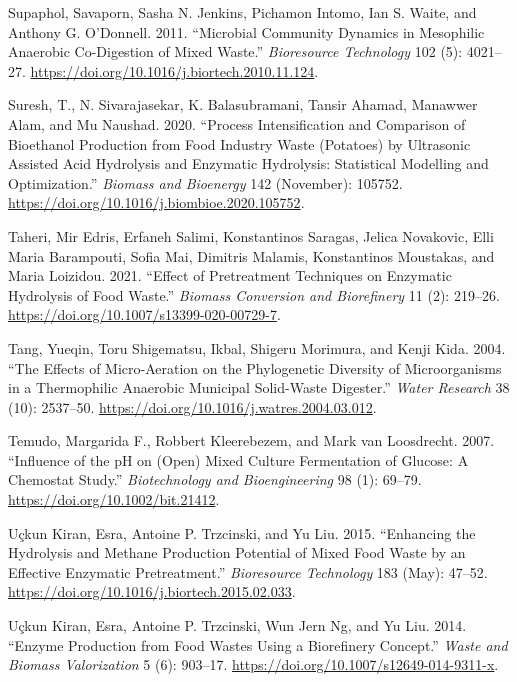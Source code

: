 \documentclass[11pt]{report}
\begin{document}
\begin{hangparas}{1.5em}{1}
\hypertarget{citeproc_bib_item_71}{Supaphol, Savaporn, Sasha N. Jenkins, Pichamon Intomo, Ian S. Waite, and Anthony G. O’Donnell. 2011. “Microbial Community Dynamics in Mesophilic Anaerobic Co-Digestion of Mixed Waste.” \textit{Bioresource Technology} 102 (5): 4021–27. \url{https://doi.org/10.1016/j.biortech.2010.11.124}.}

\hypertarget{citeproc_bib_item_72}{Suresh, T., N. Sivarajasekar, K. Balasubramani, Tansir Ahamad, Manawwer Alam, and Mu Naushad. 2020. “Process Intensification and Comparison of Bioethanol Production from Food Industry Waste (Potatoes) by Ultrasonic Assisted Acid Hydrolysis and Enzymatic Hydrolysis: Statistical Modelling and Optimization.” \textit{Biomass and Bioenergy} 142 (November): 105752. \url{https://doi.org/10.1016/j.biombioe.2020.105752}.}

\hypertarget{citeproc_bib_item_73}{Taheri, Mir Edris, Erfaneh Salimi, Konstantinos Saragas, Jelica Novakovic, Elli Maria Barampouti, Sofia Mai, Dimitris Malamis, Konstantinos Moustakas, and Maria Loizidou. 2021. “Effect of Pretreatment Techniques on Enzymatic Hydrolysis of Food Waste.” \textit{Biomass Conversion and Biorefinery} 11 (2): 219–26. \url{https://doi.org/10.1007/s13399-020-00729-7}.}

\hypertarget{citeproc_bib_item_74}{Tang, Yueqin, Toru Shigematsu, Ikbal, Shigeru Morimura, and Kenji Kida. 2004. “The Effects of Micro-Aeration on the Phylogenetic Diversity of Microorganisms in a Thermophilic Anaerobic Municipal Solid-Waste Digester.” \textit{Water Research} 38 (10): 2537–50. \url{https://doi.org/10.1016/j.watres.2004.03.012}.}

\hypertarget{citeproc_bib_item_75}{Temudo, Margarida F., Robbert Kleerebezem, and Mark van Loosdrecht. 2007. “Influence of the pH on (Open) Mixed Culture Fermentation of Glucose: A Chemostat Study.” \textit{Biotechnology and Bioengineering} 98 (1): 69–79. \url{https://doi.org/10.1002/bit.21412}.}

\hypertarget{citeproc_bib_item_76}{Uçkun Kiran, Esra, Antoine P. Trzcinski, and Yu Liu. 2015. “Enhancing the Hydrolysis and Methane Production Potential of Mixed Food Waste by an Effective Enzymatic Pretreatment.” \textit{Bioresource Technology} 183 (May): 47–52. \url{https://doi.org/10.1016/j.biortech.2015.02.033}.}

\hypertarget{citeproc_bib_item_77}{Uçkun Kiran, Esra, Antoine P. Trzcinski, Wun Jern Ng, and Yu Liu. 2014. “Enzyme Production from Food Wastes Using a Biorefinery Concept.” \textit{Waste and Biomass Valorization} 5 (6): 903–17. \url{https://doi.org/10.1007/s12649-014-9311-x}.}


\end{hangparas}
\end{document}
